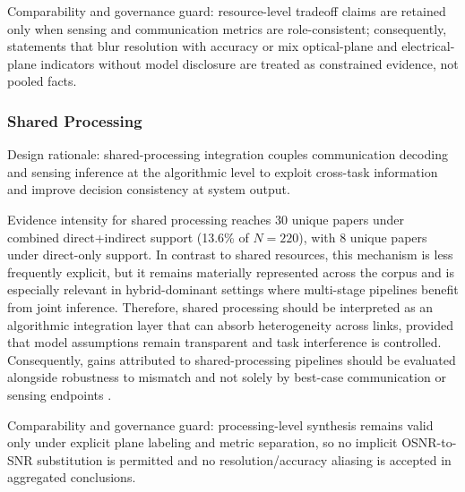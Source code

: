 \documentclass[lettersize,journal]{IEEEtran}
\begin{document}
Comparability and governance guard: resource-level tradeoff claims are retained only when sensing and communication metrics are role-consistent; consequently, statements that blur resolution with accuracy or mix optical-plane and electrical-plane indicators without model disclosure are treated as constrained evidence, not pooled facts.

\subsubsection{Shared Processing}
Design rationale: shared-processing integration couples communication decoding and sensing inference at the algorithmic level to exploit cross-task information and improve decision consistency at system output.

Evidence intensity for shared processing reaches 30 unique papers under combined direct+indirect support (13.6\% of $N=220$), with 8 unique papers under direct-only support. In contrast to shared resources, this mechanism is less frequently explicit, but it remains materially represented across the corpus and is especially relevant in hybrid-dominant settings where multi-stage pipelines benefit from joint inference. Therefore, shared processing should be interpreted as an algorithmic integration layer that can absorb heterogeneity across links, provided that model assumptions remain transparent and task interference is controlled. Consequently, gains attributed to shared-processing pipelines should be evaluated alongside robustness to mismatch and not solely by best-case communication or sensing endpoints \cite{O_ISAC_086,O_ISAC_039,O_ISAC_134,O_ISAC_381,O_ISAC_161}.

Comparability and governance guard: processing-level synthesis remains valid only under explicit plane labeling and metric separation, so no implicit OSNR-to-SNR substitution is permitted and no resolution/accuracy aliasing is accepted in aggregated conclusions.
\end{document}
